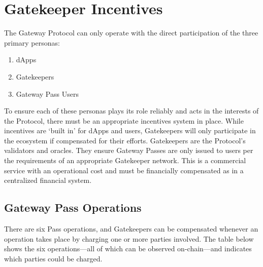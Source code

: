 \section{Gatekeeper Incentives}\label{sec:incentives}
The Gateway Protocol can only operate with the direct participation of the three primary personas:
\begin{enumerate}
\item dApps
\item Gatekeepers
\item Gateway Pass Users
\end{enumerate}
To ensure each of these personas plays its role reliably and acts in the interests of the Protocol, there must be an appropriate incentives system in place. While incentives are ‘built in’ for dApps and users, Gatekeepers will only participate in the ecosystem if compensated for their efforts.
Gatekeepers are the Protocol’s validators and oracles. They ensure Gateway Passes are only issued to users per the requirements of an appropriate Gatekeeper network. This is a commercial service with an operational cost and must be financially compensated as in a centralized financial system.

\subsection{Gateway Pass Operations}
There are six Pass operations, and Gatekeepers can be compensated whenever an operation takes place by charging one or more parties involved. The table below shows the six operations—all of which can be observed on-chain—and indicates which parties could be charged.
\clearpage


